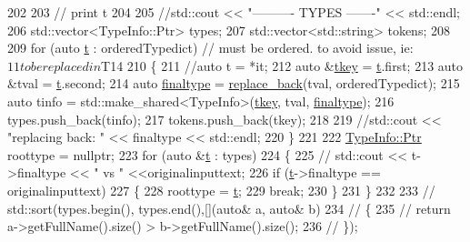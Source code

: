 \begin{DoxyCode}
202 
203     \textcolor{comment}{//     print t}
204 
205     \textcolor{comment}{//std::cout << "---------- TYPES -------" << std::endl;}
206     std::vector<TypeInfo::Ptr> types;
207     std::vector<std::string> tokens;
208 
209     \textcolor{keywordflow}{for} (\textcolor{keyword}{auto} \hyperlink{namespacebattery__monitor__node_a7a63d20d1ea461e280f4eb5b47f925cd}{t} : orderedTypedict) \textcolor{comment}{// must be ordered. to avoid issue, ie: $11 to be replaced in $T14}
210     \{
211         \textcolor{comment}{//auto t = *it;}
212         \textcolor{keyword}{auto} &\hyperlink{classsmacc_1_1introspection_1_1TypeInfo_a697dd505119258dba1224d10eea5b2bd}{tkey} = \hyperlink{namespacebattery__monitor__node_a7a63d20d1ea461e280f4eb5b47f925cd}{t}.first;
213         \textcolor{keyword}{auto} &tval = \hyperlink{namespacebattery__monitor__node_a7a63d20d1ea461e280f4eb5b47f925cd}{t}.second;
214         \textcolor{keyword}{auto} \hyperlink{classsmacc_1_1introspection_1_1TypeInfo_aa4010ed427e12db443e08ab16a3de243}{finaltype} = \hyperlink{namespacesmacc_1_1introspection_a1fdcabf57e4277cd66c46522531e35fa}{replace\_back}(tval, orderedTypedict);
215         \textcolor{keyword}{auto} tinfo = std::make\_shared<TypeInfo>(\hyperlink{classsmacc_1_1introspection_1_1TypeInfo_a697dd505119258dba1224d10eea5b2bd}{tkey}, tval, \hyperlink{classsmacc_1_1introspection_1_1TypeInfo_aa4010ed427e12db443e08ab16a3de243}{finaltype});
216         types.push\_back(tinfo);
217         tokens.push\_back(tkey);
218 
219         \textcolor{comment}{//std::cout << "replacing back: " << finaltype << std::endl;}
220     \}
221 
222     \hyperlink{classsmacc_1_1introspection_1_1TypeInfo_aa6ffd9c39811d59f7c771941b7fad860}{TypeInfo::Ptr} roottype = \textcolor{keyword}{nullptr};
223     \textcolor{keywordflow}{for} (\textcolor{keyword}{auto} &\hyperlink{namespacebattery__monitor__node_a7a63d20d1ea461e280f4eb5b47f925cd}{t} : types)
224     \{
225         \textcolor{comment}{// std::cout << t->finaltype << " vs " <<originalinputtext;}
226         \textcolor{keywordflow}{if} (\hyperlink{namespacebattery__monitor__node_a7a63d20d1ea461e280f4eb5b47f925cd}{t}->finaltype == originalinputtext)
227         \{
228             roottype = \hyperlink{namespacebattery__monitor__node_a7a63d20d1ea461e280f4eb5b47f925cd}{t};
229             \textcolor{keywordflow}{break};
230         \}
231     \}
232 
233     \textcolor{comment}{// std::sort(types.begin(), types.end(),[](auto& a, auto& b)}
234     \textcolor{comment}{// \{}
235     \textcolor{comment}{//     return a->getFullName().size() > b->getFullName().size();}
236     \textcolor{comment}{// \});}

\end{DoxyCode}
